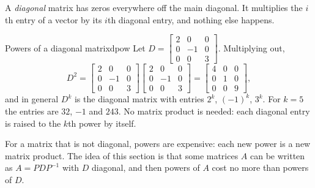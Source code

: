 \documentclass[11pt]{article}
\begin{document}
A \emph{diagonal} matrix has zeros everywhere off the main diagonal. It multiplies the $i$th entry of a vector by its $i$th diagonal entry, and nothing else happens.

\begin{exmp}{Powers of a diagonal matrix}{dpow}
Let $D=\begin{bmatrix}2&0&0\\0&-1&0\\0&0&3\end{bmatrix}$. Multiplying out,
\[
D^2=\begin{bmatrix}2&0&0\\0&-1&0\\0&0&3\end{bmatrix}\begin{bmatrix}2&0&0\\0&-1&0\\0&0&3\end{bmatrix}=\begin{bmatrix}4&0&0\\0&1&0\\0&0&9\end{bmatrix},
\]
and in general $D^k$ is the diagonal matrix with entries $2^k$, $(-1)^k$, $3^k$. For $k=5$ the entries are $32$, $-1$ and $243$. No matrix product is needed: each diagonal entry is raised to the $k$th power by itself.
\end{exmp}

For a matrix that is not diagonal, powers are expensive: each new power is a new matrix product. The idea of this section is that some matrices $A$ can be written as $A=PDP^{-1}$ with $D$ diagonal, and then powers of $A$ cost no more than powers of $D$.
\end{document}
